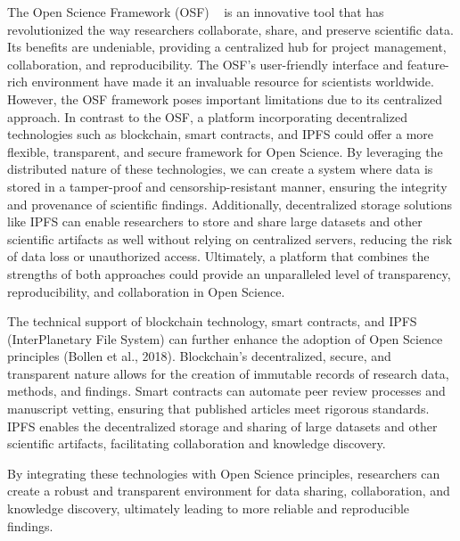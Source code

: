 The Open Science Framework (OSF) ~\cite{foster_open_2017} is an innovative tool that has revolutionized the way researchers collaborate, share, and preserve scientific data. Its benefits are undeniable, providing a centralized hub for project management, collaboration, and reproducibility. The OSF's user-friendly interface and feature-rich environment have made it an invaluable resource for scientists worldwide. However, the OSF framework poses important limitations due to its centralized approach. In contrast to the OSF, a platform incorporating decentralized technologies such as blockchain, smart contracts, and IPFS could offer a more flexible, transparent, and secure framework for Open Science. By leveraging the distributed nature of these technologies, we can create a system where data is stored in a tamper-proof and censorship-resistant manner, ensuring the integrity and provenance of scientific findings. Additionally, decentralized storage solutions like IPFS can enable researchers to store and share large datasets and other scientific artifacts as well without relying on centralized servers, reducing the risk of data loss or unauthorized access. Ultimately, a platform that combines the strengths of both approaches could provide an unparalleled level of transparency, reproducibility, and collaboration in Open Science.

The technical support of blockchain technology, smart contracts, and IPFS (InterPlanetary File System) can further enhance the adoption of Open Science principles (Bollen et al., 2018). Blockchain's decentralized, secure, and transparent nature allows for the creation of immutable records of research data, methods, and findings. Smart contracts can automate peer review processes and manuscript vetting, ensuring that published articles meet rigorous standards. IPFS enables the decentralized storage and sharing of large datasets and other scientific artifacts, facilitating collaboration and knowledge discovery.

By integrating these technologies with Open Science principles, researchers can create a robust and transparent environment for data sharing, collaboration, and knowledge discovery, ultimately leading to more reliable and reproducible findings.



